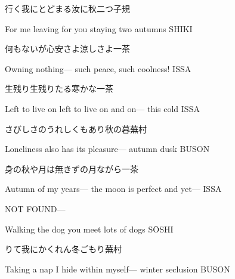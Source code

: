 \begin{haiku}
    {\FH 行く我にとどまる汝に秋二つ}\hfill{\FH 子規}

    \vin{} For me leaving
    \vin{} \vin{} for you staying
    \vin{} \vin{} \vin{} two autumns \hspace{\fill} SHIKI
\end{haiku}

\begin{haiku}
    {\FH 何もないが心安さよ涼しさよ}\hfill{\FH 一茶}

    \vin{} Owning nothing---
    \vin{} \vin{} such peace,
    \vin{} \vin{} \vin{} such coolness! \hspace{\fill} ISSA
\end{haiku}

\begin{haiku}
    {\FH 生残り生残りたる寒かな}\hfill{\FH 一茶}

    \vin{} Left to live on
    \vin{} \vin{} left to live on and on---
    \vin{} \vin{} \vin{} this cold \hspace{\fill} ISSA
\end{haiku}

\begin{haiku}
    {\FH さびしさのうれしくもあり秋の暮}\hfill{\FH 蕪村}

    \vin{} Loneliness
    \vin{} \vin{} also has its pleasure---
    \vin{} \vin{} \vin{} autumn dusk \hspace{\fill} BUSON
\end{haiku}

\begin{haiku}
    {\FH 身の秋や月は無きずの月ながら}\hfill{\FH 一茶}

    \vin{} Autumn of my years---
    \vin{} \vin{} the moon is perfect
    \vin{} \vin{} \vin{} and yet--- \hspace{\fill} ISSA
\end{haiku}

\begin{haiku}
   NOT FOUND\hfill{---}

    \vin{} Walking the dog
    \vin{} \vin{} you meet
    \vin{} \vin{} \vin{} lots of dogs \hspace{\fill} S\={O}SHI
\end{haiku}

\begin{haiku}
    {\FH {}りて我にかくれん冬ごもり}\hfill{\FH 蕪村}

    \vin{} Taking a nap
    \vin{} \vin{} I hide within myself---
    \vin{} \vin{} \vin{} winter seclusion \hspace{\fill} BUSON
\end{haiku}

